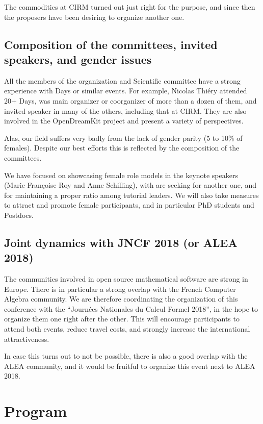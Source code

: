 \documentclass[12pt]{amsart}
\begin{document}
The commodities at CIRM turned out just right for the purpose, and
since then the proposers have been desiring to organize another one.

\subsection{Composition of the committees, invited speakers, and gender issues}

All the members of the organization and Scientific committee have a
strong experience with \Sage Days or similar events. For example,
Nicolas Thiéry attended 20+ \Sage Days, was main organizer or
coorganizer of more than a dozen of them, and invited speaker in many
of the others, including that at CIRM. They are also involved in the
OpenDreamKit project and present a variety of perspectives.

Alas, our field suffers very badly from the lack of gender parity (5
to 10\% of females). Despite our best efforts this is reflected by the
composition of the committees.

We have focused on showcasing female role models in the keynote
speakers (Marie Françoise Roy and Anne Schilling), with are seeking
for another one, and for maintaining a proper ratio among tutorial
leaders. We will also take measures to attract and promote female
participants, and in particular PhD students and Postdocs.

\subsection{Joint dynamics with JNCF 2018 (or ALEA 2018)}

The communities involved in open source mathematical software are
strong in Europe. There is in particular a strong overlap with the
French Computer Algebra community. We are therefore coordinating the
organization of this conference with the ``Journées Nationales du
Calcul Formel 2018'', in the hope to organize them one right after the
other. This will encourage participants to attend both events, reduce
travel costs, and strongly increase the international attractiveness.

In case this turns out to not be possible, there is also a good
overlap with the ALEA community, and it would be fruitful to organize
this event next to ALEA 2018.

\section{Program}
\end{document}
